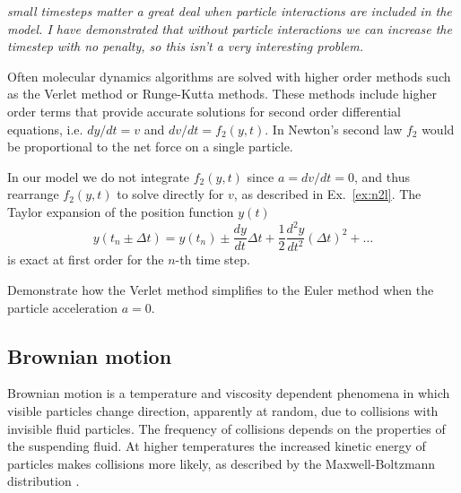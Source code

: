 \documentclass[twocolumn,preprintnumbers,amsmath,amssymb,aps,prx]{revtex4}
\begin{document}
  {\it small timesteps matter a great deal when particle interactions
    are included in the model.  I have demonstrated that
    without particle interactions we can increase the timestep
  with no penalty, so this isn't a very interesting problem.}


  Often molecular dynamics algorithms 
  are solved with higher order methods
  such as the Verlet method or Runge-Kutta methods.
  These methods include  higher order terms
  that provide accurate solutions for
  second order differential equations,
  i.e. $dy/dt = v$ and $dv/dt = f_2(y,t)$.
  In Newton's second law $f_2$ would be proportional
  to the net force on a single particle.

  In our model 
  we do not integrate $f_2(y,t)$ since 
  $a = dv/dt = 0$,
  and thus rearrange $f_2(y,t)$ to solve directly for $v$,
  as described in Ex.~\ref{ex:n2l}.
  The Taylor expansion of the position function $y(t)$
  \begin{equation}
    y(t_n \pm \Delta t) = y(t_n) \pm \frac{dy}{dt} \Delta t + \frac{1}{2} \frac{d^2y}{dt^2} (\Delta t)^2 + \ldots
  \end{equation}
  is exact at first order
  for the $n$-th time step.
  
  Demonstrate how the Verlet method
  simplifies to the Euler method when
  the particle acceleration $a=0$.



  \subsection{Brownian motion}
  \label{ex:brownian}
  Brownian motion 
  is a temperature and viscosity dependent
  phenomena in which 
  visible particles change direction,
  apparently at random, 
  due to collisions with invisible fluid particles.
  The frequency of collisions depends on the properties of
  the suspending fluid.
  At higher temperatures
  the increased kinetic energy of particles
  makes collisions more likely, 
  as described by the Maxwell-Boltzmann distribution \cite{Einstein1905}.
  
\end{document}
